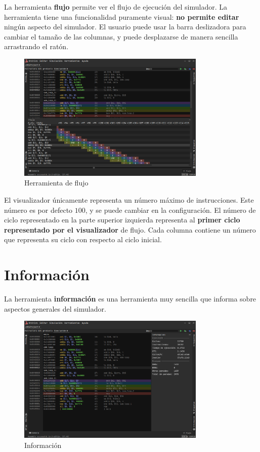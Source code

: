 La herramienta \textbf{flujo} permite ver el flujo de ejecución del simulador.
La herramienta tiene una funcionalidad puramente visual:
\textbf{no permite editar} ningún aspecto del simulador.
El usuario puede usar la barra deslizadora para cambiar el tamaño de las columnas,
y puede desplazarse de manera sencilla arrastrando el ratón.

\begin{figure}[H]
    \centering
    \includegraphics[width=0.8\textwidth]{images/tools/jams-flow}
    \caption{Herramienta de flujo}
    \label{fig:jams-flow}
\end{figure}

El visualizador únicamente representa un número máximo de instrucciones.
Este número es por defecto $100$, y se puede cambiar en la configuración.
El número de ciclo representado en la parte superior izquierda representa
al \textbf{primer ciclo representado por el visualizador} de flujo.
Cada columna contiene un número que representa su ciclo con respecto al ciclo inicial.

\section{Información}\label{sec:informacion}

La herramienta \textbf{información} es una herramienta muy sencilla
que informa sobre aspectos generales del simulador.

\begin{figure}[H]
    \centering
    \includegraphics[width=0.8\textwidth]{images/tools/jams-information}
    \caption{Información}
    \label{fig:jams-information}
\end{figure}

